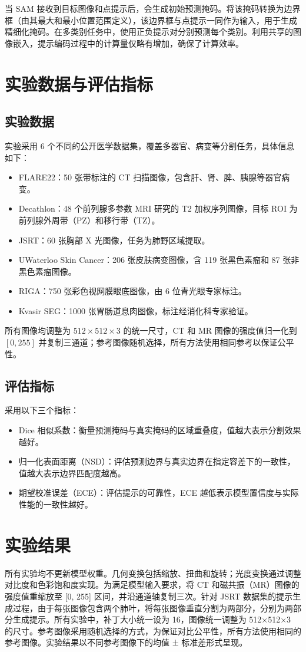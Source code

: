 \documentclass[12pt,a4paper]{article}
\begin{document}
	当 SAM 接收到目标图像和点提示后，会生成初始预测掩码。将该掩码转换为边界框（由其最大和最小位置范围定义），该边界框与点提示一同作为输入，用于生成精细化掩码。在多类别任务中，使用正负提示对分别预测每个类别。利用共享的图像嵌入，提示编码过程中的计算量仅略有增加，确保了计算效率。
	
	\section{实验数据与评估指标}
	\subsection{实验数据}
	\noindent 实验采用 6 个不同的公开医学数据集，覆盖多器官、病变等分割任务，具体信息如下：
	\begin{itemize}
		\item FLARE22：50 张带标注的 CT 扫描图像，包含肝、肾、脾、胰腺等器官病变。
		\item Decathlon：48 个前列腺多参数 MRI 研究的 T2 加权序列图像，目标 ROI 为前列腺外周带（PZ）和移行带（TZ）。
		\item JSRT：60 张胸部 X 光图像，任务为肺野区域提取。
		\item UWaterloo Skin Cancer：206 张皮肤病变图像，含 119 张黑色素瘤和 87 张非黑色素瘤图像。
		\item RIGA：750 张彩色视网膜眼底图像，由 6 位青光眼专家标注。
		\item Kvasir SEG：1000 张胃肠道息肉图像，标注经消化科专家验证。
	\end{itemize}
	所有图像均调整为 $512 \times 512 \times 3$ 的统一尺寸，CT 和 MR 图像的强度值归一化到 $[0,255]$ 并复制三通道；参考图像随机选择，所有方法使用相同参考以保证公平性。
	\subsection{评估指标}
	\noindent 采用以下三个指标：
	\begin{itemize}
		\item Dice 相似系数：衡量预测掩码与真实掩码的区域重叠度，值越大表示分割效果越好。
		\item 归一化表面距离（NSD）：评估预测边界与真实边界在指定容差下的一致性，值越大表示边界匹配度越高。
		\item 期望校准误差（ECE）：评估提示的可靠性，ECE 越低表示模型置信度与实际性能的一致性越好。
	\end{itemize}
	
	\section{实验结果}
	所有实验均不更新模型权重。几何变换包括缩放、扭曲和旋转；光度变换通过调整对比度和色彩饱和度实现。为满足模型输入要求，将 CT 和磁共振（MR）图像的强度值重缩放至 [0, 255] 区间，并沿通道轴复制三次。针对 JSRT 数据集的提示生成过程，由于每张图像包含两个肺叶，将每张图像垂直分割为两部分，分别为两部分生成提示。所有实验中，补丁大小统一设为 16，图像统一调整为 512×512×3 的尺寸。参考图像采用随机选择的方式，为保证对比公平性，所有方法使用相同的参考图像。实验结果以不同参考图像下的均值 ± 标准差形式呈现。
	
\end{document}
